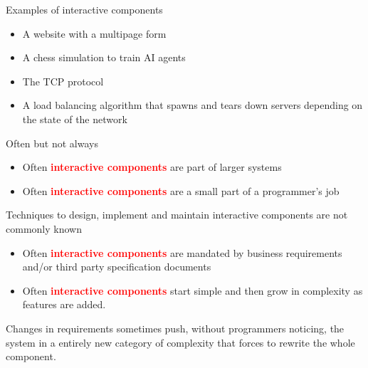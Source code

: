 \documentclass[aspectratio=169,11pt]{beamer}
\begin{document}
\begin{frame}[fragile]{Examples of interactive components}
    \begin{itemize}
        \item A website with a multipage form
        \item A chess simulation to train AI agents
        \item The TCP protocol 
        \item A load balancing algorithm that spawns and tears down servers depending on the state of the network
    \end{itemize}
\end{frame}

\begin{frame}[fragile]{Often but not always}
    \begin{itemize}
        \item Often \textbf{\textcolor{red}{interactive components}} are part of larger systems
        \item Often \textbf{\textcolor{red}{interactive components}} are a small part of a programmer's job
    \end{itemize}
        Techniques to design, implement and maintain interactive components are not commonly known
    \linebreak
    \begin{itemize}
        \item Often \textbf{\textcolor{red}{interactive components}} are mandated by business requirements and/or third party specification documents
        \item Often  \textbf{\textcolor{red}{interactive components}} start simple and then grow in complexity as features are added. 
    \end{itemize}
       Changes in requirements sometimes push, without programmers noticing, the system in a entirely new category of complexity that forces to rewrite the whole component.
\end{frame}





\end{document}
